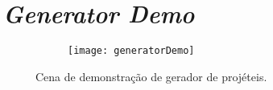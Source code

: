 
\chapter{\textit{Generator Demo}}
\label{ap:generator demo}

\begin{figure}
    \centering

    \begin{subfigure}{1\textwidth}
        \centering
        \texttt{[image: generatorDemo]}
    \end{subfigure}

    \caption{Cena de demonstração de gerador de projéteis.\label{generatorDemo}}
\end{figure}